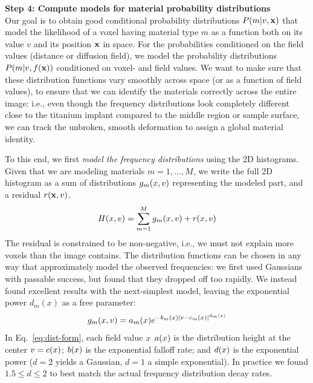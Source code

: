 \documentclass[pdflatex,sn-mathphys]{sn-jnl}%
\theoremstyle{thmstyleone}%
\theoremstyle{thmstyletwo}%
\theoremstyle{thmstylethree}%
\begin{document}
\vspace{\baselineskip}
\noindent\textbf{Step 4: Compute models for material probability distributions} \\
Our goal is to obtain good conditional probability distributions $P\!\left(m\middle\vert v,\mathbf{x}\right)$
that model the likelihood of a voxel having material type $m$ as a function
both on its value $v$ and its position $\mathbf{x}$ in space. For the probabilities
conditioned on the field values (distance or diffusion field), we model
the probability distributions $P\!\left(m\middle\vert v,f(\mathbf{x})\right)$ conditioned on
voxel- and field values. We want to make sure that these distribution
functions vary smoothly across space (or as a function of field values),
to ensure that we can identify the materials correctly across the entire
image: i.e., even though the frequency distributions look completely different
close to the titanium implant compared to the middle region or sample surface,
we can track the unbroken, smooth deformation to assign a global material
identity.

To this end, we first {\it model the frequency distributions} using the
2D histograms. Given that we are modeling materials $m=1,\ldots,M$,
we write the full 2D histogram as a sum of distributions
$g_m(x,v)$ representing the modeled part, and a
residual $r(\mathbf{x},v)$.
\begin{equation}
  \label{eq:hist}
  H(x,v) = \sum_{m=1}^M g_m(x,v) + r(x,v)
\end{equation}
The residual is constrained to be non-negative, i.e., we must not explain
more voxels than the image contains.
The distribution functions can be chosen in any way that approximately
model the observed frequencies: we first used Gaussians with passable success,
but found that they dropped off too rapidly. We instead found excellent results
with the next-simplest model, leaving the exponential power $d_m(x)$ as a free parameter:
\begin{equation}
  \label{eq:dist-form}
  g_m(x,v) = a_m(x) e^{-b_m(x) \vert v-c_m(x)\vert^{d_m(x)}}
\end{equation}
In Eq.~\eqref{eq:dist-form}, each field value $x$
$a(x)$ is the distribution height at the center $v=c(x)$;
$b(x)$ is the exponential falloff rate; and $d(x)$ is
the exponential power ($d=2$ yields a Gaussian, $d=1$ a simple exponential).
In practice we found $1.5\le d \le 2$ to best match the actual frequency
distribution decay rates.
\end{document}
